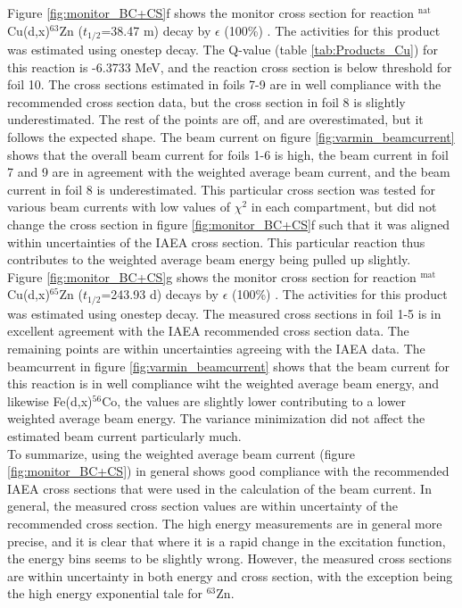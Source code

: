 \noindent 
Figure \ref{fig:monitor_BC+CS}f shows the monitor cross section for reaction $^\text{nat}$Cu(d,x)$^{63}$Zn ($t_{1/2}$=38.47 m) decay by $\epsilon$ (100\%) \cite{ERJUN2001}. The activities for this product was estimated using onestep decay. The Q-value (table \ref{tab:Products_Cu}) for this reaction is -6.3733 MeV, and the reaction cross section is below threshold for foil 10. The cross sections estimated in foils 7-9 are in well compliance with the recommended cross section data, but the cross section in foil 8 is slightly underestimated. The rest of the points are off, and are overestimated, but it follows the expected shape. The beam current on figure \ref{fig:varmin_beamcurrent} shows that the overall beam current for foils 1-6 is high, the beam current in foil 7 and 9 are in agreement with the weighted average beam current, and the beam current in foil 8 is underestimated. This particular cross section was tested for various beam currents with low values of $\chi^2$ in each compartment, but did not change the cross section in figure \ref{fig:monitor_BC+CS}f such that it was aligned within uncertainties of the IAEA cross section. This particular reaction thus contributes to the weighted average beam energy being pulled up slightly. \\

\newline 
Figure \ref{fig:monitor_BC+CS}g shows the monitor cross section for reaction $^\text{mat}$Cu(d,x)$^{65}$Zn ($t_{1/2}$=243.93 d) decays by $\epsilon$ (100\%) \cite{Browne2010}. The activities for this product was estimated using onestep decay. The measured cross sections in foil 1-5 is in excellent agreement with the IAEA recommended cross section data. The remaining points are within uncertainties agreeing with the IAEA data. The beamcurrent in figure \ref{fig:varmin_beamcurrent} shows that the beam current for this reaction is in well compliance wiht the weighted average beam energy, and likewise Fe(d,x)$^{56}$Co, the values are slightly lower contributing to a lower weighted average beam energy. The variance minimization did not affect the estimated beam current particularly much.  \\

\noindent 
To summarize, using the weighted average beam current (figure \ref{fig:monitor_BC+CS}) in general shows good compliance with the recommended IAEA cross sections that were used in the calculation of the beam current. In general, the measured cross section values are within uncertainty of the recommended cross section. The high energy measurements are in general more precise, and it is clear that where it is a rapid change in the excitation function, the energy bins seems to be slightly wrong. However, the measured cross sections are within uncertainty in both energy and cross section, with the exception being the high energy exponential tale for $^{63}$Zn. 

